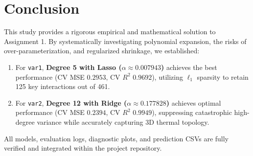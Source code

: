 \documentclass[10pt,a4paper]{article}
\begin{document}
\section{Conclusion}
This study provides a rigorous empirical and mathematical solution to Assignment 1. By systematically investigating polynomial expansion, the risks of over-parameterization, and regularized shrinkage, we established:
\begin{enumerate}
    \item For \texttt{var1}, \textbf{Degree 5 with Lasso ($\alpha \approx 0.007943$)} achieves the best performance (CV MSE $0.2953$, CV $R^2$ $0.9692$), utilizing $\ell_1$ sparsity to retain 125 key interactions out of 461.
    \item For \texttt{var2}, \textbf{Degree 12 with Ridge ($\alpha \approx 0.177828$)} achieves optimal performance (CV MSE $0.2394$, CV $R^2$ $0.9949$), suppressing catastrophic high-degree variance while accurately capturing 3D thermal topology.
\end{enumerate}
All models, evaluation logs, diagnostic plots, and prediction CSVs are fully verified and integrated within the project repository.
\end{document}
